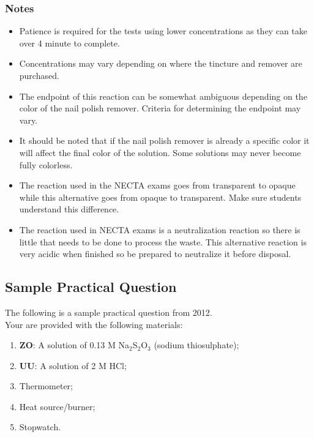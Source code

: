 \subsubsection{Notes}
\begin{itemize}
\item Patience is required for the tests using lower concentrations as they can take over 4 minute to complete.
\item Concentrations may vary depending on where the tincture and remover are purchased.
\item The endpoint of this reaction can be somewhat ambiguous depending on the color of the nail polish remover. Criteria for determining the endpoint may vary.
\item It should be noted that if the nail polish remover is already a specific color it will affect the final color of the solution. Some solutions may never become fully colorless.
\item The reaction used in the NECTA exams goes from transparent to opaque while this alternative goes from opaque to transparent. Make sure students understand this difference.
\item The reaction used in NECTA exams is a neutralization reaction so there is little that needs to be done to process the waste. This alternative reaction is very acidic when finished so be prepared to 	neutralize it before disposal.
\end{itemize}

\subsection{Sample Practical Question}
The following is a sample practical question from 2012.\\[6pt]

Your are provided with the following materials:\\
\begin{enumerate}
\item[ ] \textbf{ZO}:  A solution of 0.13 M Na$_2$S$_2$O$_3$ (sodium thiosulphate);
\item[ ] \textbf{UU}:  A solution of 2 M HCl;
\item[ ] Thermometer;
\item[ ] Heat source/burner;
\item[ ] Stopwatch.\\
\end{enumerate}

